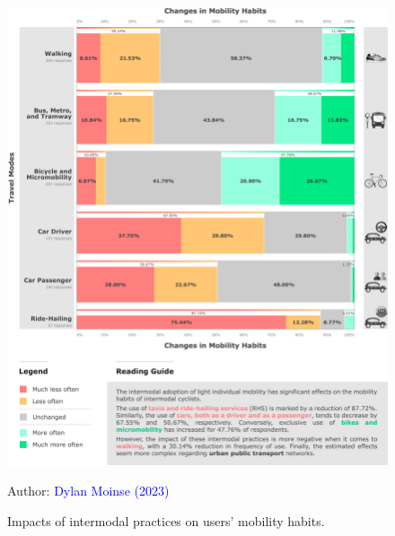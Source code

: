 \begin{refsegment}
\begin{figure}[h!]\vspace*{4pt}
    \caption{Impacts of intermodal practices on users' mobility habits.}
    \label{fig-chap4:impacts-adoption-autres-modes}
    \centerline{\includegraphics[width=1\columnwidth]{src/Figures/Chap-4/EN_Substitution_modale.pdf}}
    \vspace{5pt}
    \begin{flushright}\scriptsize{
    Author: \textcolor{blue}{Dylan Moinse (2023)}
    }\end{flushright}
\end{figure}


\end{refsegment}

